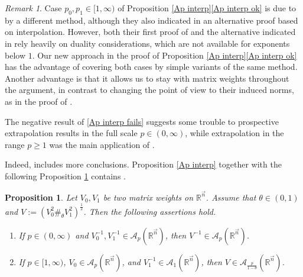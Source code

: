 \documentclass[11pt, reqno]{amsart}
\newtheorem{proposition}[theorem]{Proposition}
\theoremstyle{definition}
\theoremstyle{remark}
\newtheorem{remark}[theorem]{Remark}
\numberwithin{equation}{section}
\newcommand{\A}{\mathscr A}
\newcommand{\R}{\mathbb R}
\newcommand{\vn}{\vec n}
\begin{document}
\begin{remark}\label{re2.35}
Case $p_0,p_1\in[1,\infty)$ of Proposition \ref{Ap interp}\eqref{Ap interp ok} is due to
\cite[Proposition 8.8]{BCU} by a different method,
although they also indicated in \cite[Remark 8.10]{BCU}
an alternative proof based on interpolation.
However, both their first proof of \cite[Proposition 8.8]{BCU}
and the alternative indicated in \cite[Remark 8.10]{BCU}
rely heavily on duality considerations, which are not available
for exponents below $1$. Our new approach in the proof of
Proposition \ref{Ap interp}\eqref{Ap interp ok} has the advantage of covering both cases by simple variants of the same method. Another advantage is that it allows us to stay with matrix weights throughout the argument, in contrast to changing the
point of view to their induced norms, as in the proof of \cite[Proposition 8.8]{BCU}.

The negative result of \eqref{Ap interp fails} suggests some trouble to prospective
extrapolation results in the full scale $p\in(0,\infty)$,
while extrapolation in the range $p\geq 1$
was the main application of \cite[Proposition 8.8]{BCU}.
\end{remark}

Indeed, \cite[Proposition 8.8]{BCU} includes more conclusions.
Proposition \ref{Ap interp} together with the following Proposition \ref{BCU2}
contains \cite[Proposition 8.8]{BCU}.

\begin{proposition} \label{BCU2}
Let $V_0,V_1$ be two matrix weights on $\R^{\vn}$.
Assume that $\theta\in(0,1)$ and $V:=(V_0^2\#_\theta V_1^2)^{\frac12}$.
Then the following assertions hold.
\begin{enumerate}[\rm(i)]
\item\label{BCU22}
If $p\in(0,\infty)$ and $V_0^{-1},V_1^{-1}\in \A_p(\R^{\vn})$,
then $V^{-1}\in\A_p(\R^{\vn})$.

\item\label{BCU21}
If $p\in[1,\infty)$, $V_0\in \A_p(\R^{\vn})$,
and $V_1^{-1}\in \A_1(\R^{\vn})$,
then $V\in\A_{\frac p{1-\theta}}(\R^{\vn})$.
\end{enumerate}
\end{proposition}
\end{document}
